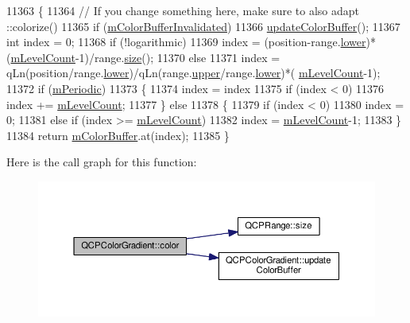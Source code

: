 \begin{DoxyCode}
11363 \{
11364   \textcolor{comment}{// If you change something here, make sure to also adapt ::colorize()}
11365   \textcolor{keywordflow}{if} (\hyperlink{class_q_c_p_color_gradient_abacf55e11f67d6722a687af1bb2687bd}{mColorBufferInvalidated})
11366     \hyperlink{class_q_c_p_color_gradient_a353f15ab3ab586eebf1f6b58c3e2707b}{updateColorBuffer}();
11367   \textcolor{keywordtype}{int} index = 0;
11368   \textcolor{keywordflow}{if} (!logarithmic)
11369     index = (position-range.\hyperlink{class_q_c_p_range_aa3aca3edb14f7ca0c85d912647b91745}{lower})*(\hyperlink{class_q_c_p_color_gradient_a98fb68e359904b2c991fcae3e38a211a}{mLevelCount}-1)/range.\hyperlink{class_q_c_p_range_afa57c13049b965edb6fd1c00ac56338a}{size}();
11370   \textcolor{keywordflow}{else}
11371     index = qLn(position/range.\hyperlink{class_q_c_p_range_aa3aca3edb14f7ca0c85d912647b91745}{lower})/qLn(range.\hyperlink{class_q_c_p_range_ae44eb3aafe1d0e2ed34b499b6d2e074f}{upper}/range.\hyperlink{class_q_c_p_range_aa3aca3edb14f7ca0c85d912647b91745}{lower})*(
      \hyperlink{class_q_c_p_color_gradient_a98fb68e359904b2c991fcae3e38a211a}{mLevelCount}-1);
11372   \textcolor{keywordflow}{if} (\hyperlink{class_q_c_p_color_gradient_a4b07deeb20ca1ee2d5ea7e01bf0420af}{mPeriodic})
11373   \{
11374     index = index %
11375     \textcolor{keywordflow}{if} (index < 0)
11376       index += \hyperlink{class_q_c_p_color_gradient_a98fb68e359904b2c991fcae3e38a211a}{mLevelCount};
11377   \} \textcolor{keywordflow}{else}
11378   \{
11379     \textcolor{keywordflow}{if} (index < 0)
11380       index = 0;
11381     \textcolor{keywordflow}{else} \textcolor{keywordflow}{if} (index >= \hyperlink{class_q_c_p_color_gradient_a98fb68e359904b2c991fcae3e38a211a}{mLevelCount})
11382       index = \hyperlink{class_q_c_p_color_gradient_a98fb68e359904b2c991fcae3e38a211a}{mLevelCount}-1;
11383   \}
11384   \textcolor{keywordflow}{return} \hyperlink{class_q_c_p_color_gradient_af8b5f0739faa5f8295154d47ce38ecff}{mColorBuffer}.at(index);
11385 \}
\end{DoxyCode}


Here is the call graph for this function\+:\nopagebreak
\begin{figure}[H]
\begin{center}
\leavevmode
\includegraphics[width=350pt]{class_q_c_p_color_gradient_a0599545c859268b025d2060dea741cea_cgraph}
\end{center}
\end{figure}




